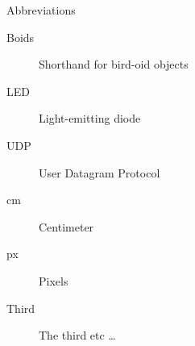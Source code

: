 Abbreviations

\begin{description}
  \item[Boids] Shorthand for bird-oid objects
  \item[LED] Light-emitting diode
  \item[UDP] User Datagram Protocol
  \item[cm] Centimeter
  \item [px] Pixels
  \item[Third] The third etc \ldots
\end{description}
